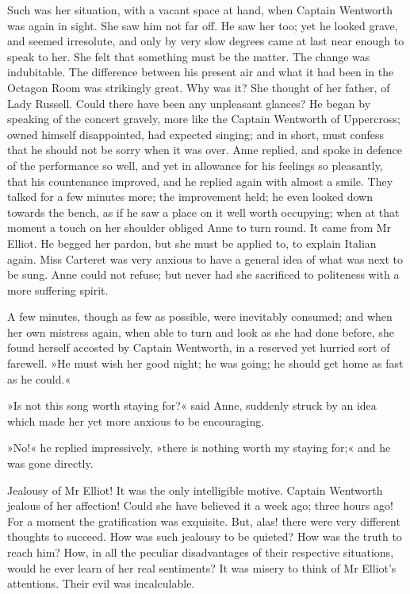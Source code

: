 Such was her situation, with a vacant space at hand, when Captain Wentworth was again in sight. She saw him not far off. He saw her too; yet he looked grave, and seemed irresolute, and only by very slow degrees came at last near enough to speak to her. She felt that something must be the matter. The change was indubitable. The difference between his present air and what it had been in the Octagon Room was strikingly great. Why was it? She thought of her father, of Lady Russell. Could there have been any unpleasant glances? He began by speaking of the concert gravely, more like the Captain Wentworth of Uppercross; owned himself disappointed, had expected singing; and in short, must confess that he should not be sorry when it was over. Anne replied, and spoke in defence of the performance so well, and yet in allowance for his feelings so pleasantly, that his countenance improved, and he replied again with almost a smile. They talked for a few minutes more; the improvement held; he even looked down towards the bench, as if he saw a place on it well worth occupying; when at that moment a touch on her shoulder obliged Anne to turn round. It came from Mr Elliot. He begged her pardon, but she must be applied to, to explain Italian again. Miss Carteret was very anxious to have a general idea of what was next to be sung. Anne could not refuse; but never had she sacrificed to politeness with a more suffering spirit.

A few minutes, though as few as possible, were inevitably consumed; and when her own mistress again, when able to turn and look as she had done before, she found herself accosted by Captain Wentworth, in a reserved yet hurried sort of farewell. »He must wish her good night; he was going; he should get home as fast as he could.«

»Is not this song worth staying for?« said Anne, suddenly struck by an idea which made her yet more anxious to be encouraging.

»No!« he replied impressively, »there is nothing worth my staying for;« and he was gone directly.

Jealousy of Mr Elliot! It was the only intelligible motive. Captain Wentworth jealous of her affection! Could she have believed it a week ago; three hours ago! For a moment the gratification was exquisite. But, alas! there were very different thoughts to succeed. How was such jealousy to be quieted? How was the truth to reach him? How, in all the peculiar disadvantages of their respective situations, would he ever learn of her real sentiments? It was misery to think of Mr Elliot's attentions. Their evil was incalculable.